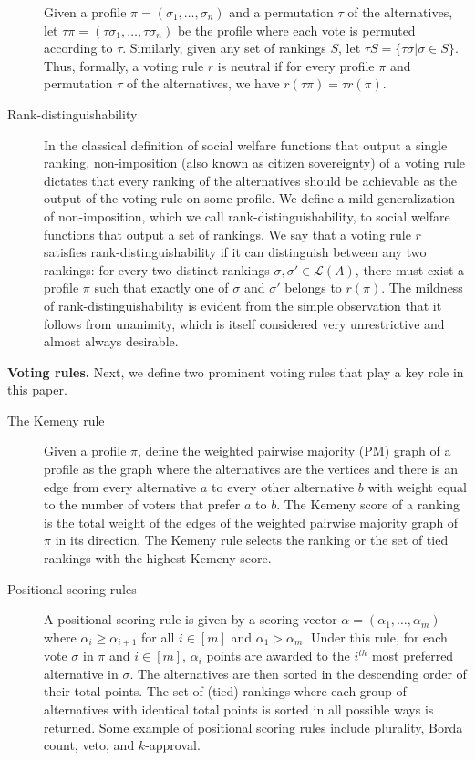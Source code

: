 \documentclass[prodmode,acmec]{ec-acmsmall}
\newcommand{\calL}{{\mathcal{L}}}
\newcommand{\rank}{{\calL(A)}}
\begin{document}
\begin{description}
Given a profile $\pi = (\sigma_1,\ldots,\sigma_n)$ and a permutation $\tau$ of the alternatives, let $\tau \pi = (\tau \sigma_1,\ldots,\tau \sigma_n)$ be the profile where each vote is permuted according to $\tau$. Similarly, given any set of rankings $S$, let $\tau S = \{\tau \sigma | \sigma \in S\}$. Thus, formally, a voting rule $r$ is neutral if for every profile $\pi$ and permutation $\tau$ of the alternatives, we have $r(\tau \pi) = \tau r(\pi)$. \\

\item[Rank-distinguishability] In the classical definition of social welfare functions that output a single ranking, non-imposition (also known as citizen sovereignty) of a voting rule dictates that every ranking of the alternatives should be achievable as the output of the voting rule on some profile. We define a mild generalization of non-imposition, which we call rank-distinguishability, to social welfare functions that output a set of rankings. We say that a voting rule $r$ satisfies rank-distinguishability if it can distinguish between any two rankings: for every two distinct rankings $\sigma, \sigma' \in \rank$, there must exist a profile $\pi$ such that exactly one of $\sigma$ and $\sigma'$ belongs to $r(\pi)$. The mildness of rank-distinguishability is evident from the simple observation that it follows from unanimity, which is itself considered very unrestrictive and almost always desirable. 
\end{description}


\noindent \textbf{Voting rules.} Next, we define two prominent voting rules that play a key role in this paper. 
\begin{description}

\item[The Kemeny rule] Given a profile $\pi$, define the weighted pairwise majority (PM) graph of a profile as the graph where the alternatives are the vertices and there is an edge from every alternative $a$ to every other alternative $b$ with weight equal to the number of voters that prefer $a$ to $b$. The Kemeny score of a ranking is the total weight of the edges of the weighted pairwise majority graph of $\pi$ in its direction. The Kemeny rule selects the ranking or the set of tied rankings with the highest Kemeny score.\\

\item[Positional scoring rules] A positional scoring rule is given by a scoring vector $\alpha = (\alpha_1,\ldots,\alpha_m)$ where $\alpha_i \ge \alpha_{i+1}$ for all $i \in [m]$ and $\alpha_1 > \alpha_m$. Under this rule, for each vote $\sigma$ in $\pi$ and $i \in [m]$, $\alpha_i$ points are awarded to the $i^{th}$ most preferred alternative in $\sigma$. The alternatives are then sorted in the descending order of their total points. The set of (tied) rankings where each group of alternatives with identical total points is sorted in all possible ways is returned. Some example of positional scoring rules include plurality, Borda count, veto, and $k$-approval.

\end{description}
\end{document}
